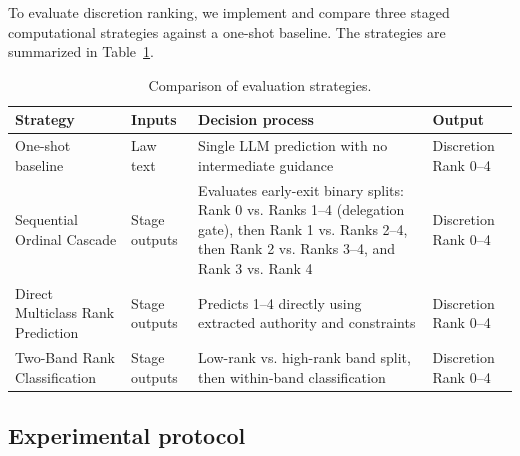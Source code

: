 \documentclass[runningheads]{llncs}
\begin{document}
To evaluate discretion ranking, we implement and compare three staged computational strategies against a one-shot baseline. The strategies are summarized in Table~\ref{tab:strategies_comparison}.

\begin{table}[t]
\centering
\caption{Comparison of evaluation strategies.}
\label{tab:strategies_comparison}
\small
\begin{tabularx}{\textwidth}{@{}
>{\raggedright\arraybackslash}p{}
>{\raggedright\arraybackslash}p{}
>{\raggedright\arraybackslash}X
>{\raggedright\arraybackslash}p{}@{}}
\toprule
\textbf{Strategy} & \textbf{Inputs} & \textbf{Decision process} & \textbf{Output} \\
\midrule
One-shot baseline & Law text & Single LLM prediction with no intermediate guidance & Discretion Rank 0--4 \\
\addlinespace
Sequential Ordinal Cascade & Stage outputs & Evaluates early-exit binary splits: Rank 0 vs. Ranks 1--4 (delegation gate), then Rank 1 vs. Ranks 2--4, then Rank 2 vs. Ranks 3--4, and Rank 3 vs. Rank 4 & Discretion Rank 0--4 \\
\addlinespace
Direct Multiclass Rank Prediction & Stage outputs & Predicts 1--4 directly using extracted authority and constraints & Discretion Rank 0--4 \\
\addlinespace
Two-Band Rank Classification & Stage outputs & Low-rank vs. high-rank band split, then within-band classification & Discretion Rank 0--4 \\
\bottomrule
\end{tabularx}
\end{table}

\subsection{Experimental protocol}
\end{document}
